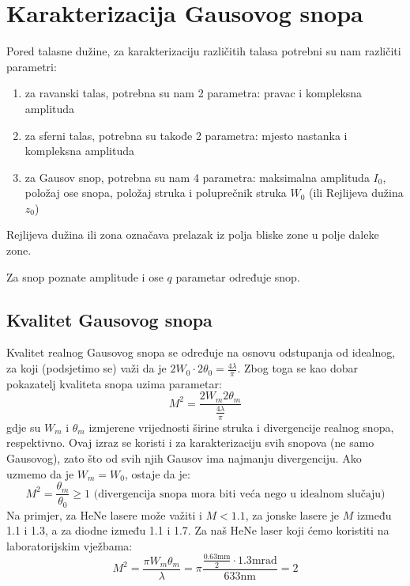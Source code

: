 \documentclass[fleqn]{report}
\begin{document}
\section{Karakterizacija Gausovog snopa}

Pored talasne dužine, za karakterizaciju različitih talasa potrebni su nam različiti parametri:
\begin{enumerate}
    \item za ravanski talas, potrebna su nam 2 parametra: pravac i kompleksna amplituda
    \item za sferni talas, potrebna su takođe 2 parametra: mjesto nastanka i kompleksna amplituda
    \item za Gausov snop, potrebna su nam 4 parametra: maksimalna amplituda $I_0$, položaj ose snopa, položaj struka i poluprečnik struka $W_0$ (ili Rejlijeva dužina $z_0$)
\end{enumerate}
\begin{tbox}
    Rejlijeva dužina ili zona označava prelazak iz polja bliske zone u polje daleke zone.
\end{tbox}
\begin{tbox}
    Za snop poznate amplitude i ose $q$ parametar određuje snop.
\end{tbox}

\subsection{Kvalitet Gausovog snopa}
Kvalitet realnog Gausovog snopa se određuje na osnovu odstupanja od idealnog, za koji (podsjetimo se) važi da je $2W_0 \cdot 2\theta_0 = \frac{4\lambda}{\pi}$.
Zbog toga se kao dobar pokazatelj kvaliteta snopa uzima parametar:
\begin{equation*}
    M^2 = \frac{2W_m2\theta_m}{\frac{4\lambda}{\pi}}
\end{equation*}
gdje su $W_m$ i $\theta_m$ izmjerene vrijednosti širine struka i divergencije realnog snopa, respektivno.
Ovaj izraz se koristi i za karakterizaciju svih snopova (ne samo Gausovog), zato što od svih njih Gausov ima najmanju divergenciju.
Ako uzmemo da je $W_m = W_0$, ostaje da je:
\begin{equation*}
    M^2 = \frac{\theta_m}{\theta_0} \geq 1 \text{ (divergencija snopa mora biti veća nego u idealnom slučaju)}
\end{equation*}
Na primjer, za HeNe lasere može važiti i $M < 1.1$, za jonske lasere je $M$ između 1.1 i 1.3, a za diodne između 1.1 i 1.7.
Za naš HeNe laser koji ćemo koristiti na laboratorijskim vježbama:
\begin{equation*}
    M^2 = \frac{\pi W_m \theta_m}{\lambda} = \pi \frac{\frac{0.63\si{\milli\meter}}{2}\cdot 1.3\si{\milli\radian}}{633\si{\nano\meter}} = 2
\end{equation*}
\end{document}
